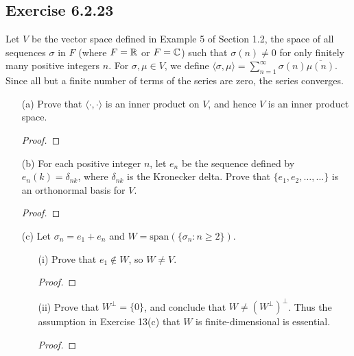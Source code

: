 \subsection*{Exercise 6.2.23} Let \( V  \) be the vector space defined in Example 5 of Section 1.2, the space of all sequences \( \sigma \) in \( F  \) (where \( F = \mathbb{R}  \) or \( F = \mathbb{C}  \)) such that \( \sigma(n) \neq 0  \) for only finitely many positive integers \( n  \). For \( \sigma, \mu \in V  \), we define \( \langle \sigma  , \mu \rangle = \sum_{ n=1  }^{ \infty   } \sigma(n) \overline{\mu(n)}.  \) Since all but a finite number of terms of the series are zero, the series converges.
\begin{enumerate}
    \item[(a)] Prove that \( \langle \cdot , \cdot \rangle \) is an inner product on \( V  \), and hence \( V  \) is an inner product space.
        \begin{proof}
        
        \end{proof}
    \item[(b)] For each positive integer \( n \), let \( {e}_{n} \) be the sequence defined by \( {e}_{n}(k) = {\delta}_{nk} \), where \( {\delta}_{nk}  \) is the Kronecker delta. Prove that \( \{ {e}_{1}, {e}_{2}, \dots, \dots \}  \) is an orthonormal basis for \( V  \).
        \begin{proof}
        
        \end{proof}
    \item[(c)] Let \( \sigma_n = {e}_{1} + {e}_{n} \) and \( W = \text{span}(\{ {\sigma}_{n}: n \geq 2 \} ) \).
        \begin{enumerate}
            \item[(i)] Prove that \( {e}_{1} \notin W  \), so \( W \neq V  \).
                \begin{proof}
                
                \end{proof}
            \item[(ii)] Prove that \( W^{\perp} = \{ 0  \}  \), and conclude that \( W \neq (W^{\perp})^{\perp}  \).
                Thus the assumption in Exercise 13(c) that \( W  \) is finite-dimensional is essential.
                \begin{proof}
                
                \end{proof}
        \end{enumerate}
\end{enumerate}
